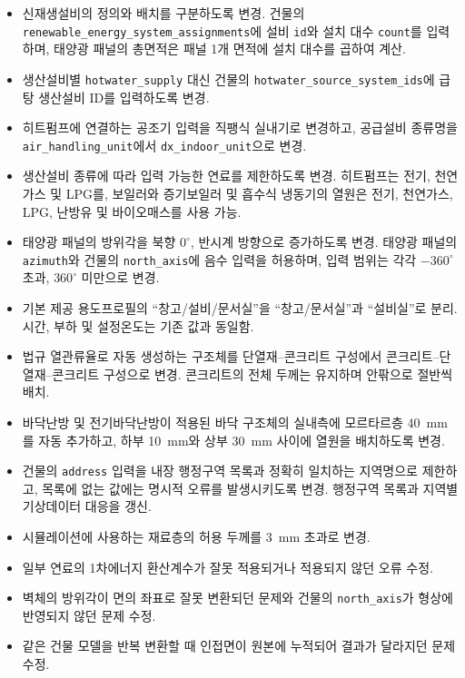 {\begin{itemize}
        \item 신재생설비의 정의와 배치를 구분하도록 변경. 건물의 \texttt{renewable\_energy\_system\_assignments}에 설비 \texttt{id}와 설치 대수 \texttt{count}를 입력하며, 태양광 패널의 총면적은 패널 1개 면적에 설치 대수를 곱하여 계산.
        \item 생산설비별 \texttt{hotwater\_supply} 대신 건물의 \texttt{hotwater\_source\_system\_ids}에 급탕 생산설비 ID를 입력하도록 변경.
        \item 히트펌프에 연결하는 공조기 입력을 직팽식 실내기로 변경하고, 공급설비 종류명을 \texttt{air\_handling\_unit}에서 \texttt{dx\_indoor\_unit}으로 변경.
        \item 생산설비 종류에 따라 입력 가능한 연료를 제한하도록 변경. 히트펌프는 전기, 천연가스 및 LPG를, 보일러와 증기보일러 및 흡수식 냉동기의 열원은 전기, 천연가스, LPG, 난방유 및 바이오매스를 사용 가능.
        \item 태양광 패널의 방위각을 북향 $0^\circ$, 반시계 방향으로 증가하도록 변경. 태양광 패널의 \texttt{azimuth}와 건물의 \texttt{north\_axis}에 음수 입력을 허용하며, 입력 범위는 각각 $-360^\circ$ 초과, $360^\circ$ 미만으로 변경.
        \item 기본 제공 용도프로필의 ``창고/설비/문서실''을 ``창고/문서실''과 ``설비실''로 분리. 시간, 부하 및 설정온도는 기존 값과 동일함.
        \item 법규 열관류율로 자동 생성하는 구조체를 단열재--콘크리트 구성에서 콘크리트--단열재--콘크리트 구성으로 변경. 콘크리트의 전체 두께는 유지하며 안팎으로 절반씩 배치.
        \item 바닥난방 및 전기바닥난방이 적용된 바닥 구조체의 실내측에 모르타르층 40~mm를 자동 추가하고, 하부 10~mm와 상부 30~mm 사이에 열원을 배치하도록 변경.
        \item 건물의 \texttt{address} 입력을 내장 행정구역 목록과 정확히 일치하는 지역명으로 제한하고, 목록에 없는 값에는 명시적 오류를 발생시키도록 변경. 행정구역 목록과 지역별 기상데이터 대응을 갱신.
        \item 시뮬레이션에 사용하는 재료층의 허용 두께를 3~mm 초과로 변경.
    \end{itemize}
}{
    \begin{itemize}
        \item 일부 연료의 1차에너지 환산계수가 잘못 적용되거나 적용되지 않던 오류 수정.
        \item 벽체의 방위각이 면의 좌표로 잘못 변환되던 문제와 건물의 \texttt{north\_axis}가 형상에 반영되지 않던 문제 수정.
        \item 같은 건물 모델을 반복 변환할 때 인접면이 원본에 누적되어 결과가 달라지던 문제 수정.

\end{itemize}}
